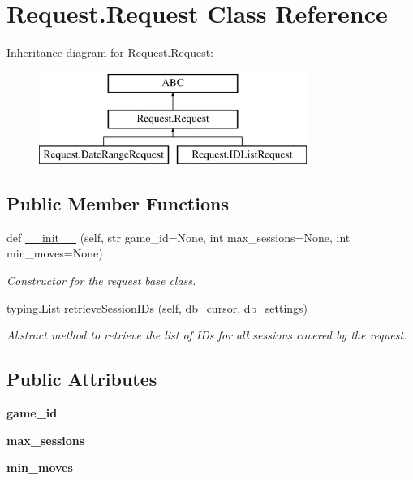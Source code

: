 \hypertarget{class_request_1_1_request}{}\section{Request.\+Request Class Reference}
\label{class_request_1_1_request}
Inheritance diagram for Request.\+Request\+:\begin{figure}[H]
\begin{center}
\leavevmode
\includegraphics[height=3.000000cm]{class_request_1_1_request}
\end{center}
\end{figure}
\subsection*{Public Member Functions}
\begin{DoxyCompactItemize}
\item 
def \mbox{\hyperlink{class_request_1_1_request_a4b2b15d3918230c6b56025e0ef7326ab}{\+\_\+\+\_\+init\+\_\+\+\_\+}} (self, str game\+\_\+id=None, int max\+\_\+sessions=None, int min\+\_\+moves=None)
\begin{DoxyCompactList}\small\item\em Constructor for the request base class. \end{DoxyCompactList}\item 
typing.\+List \mbox{\hyperlink{class_request_1_1_request_aa65df0d73c5d2524053dbedd666c7d9e}{retrieve\+Session\+I\+Ds}} (self, db\+\_\+cursor, db\+\_\+settings)
\begin{DoxyCompactList}\small\item\em Abstract method to retrieve the list of I\+Ds for all sessions covered by the request. \end{DoxyCompactList}\end{DoxyCompactItemize}
\subsection*{Public Attributes}
\begin{DoxyCompactItemize}
\item 
\mbox{\label{class_request_1_1_request_a520789a0d1abb508824a0ef6f5d4ac6e}} 
{\bfseries game\+\_\+id}
\item 
\mbox{\label{class_request_1_1_request_ae3194d12360e8581ee6d31c3fd0dbefe}} 
{\bfseries max\+\_\+sessions}
\item 
\mbox{\label{class_request_1_1_request_a7f4e3723e0b4b3415c3527caf74c6944}} 
{\bfseries min\+\_\+moves}
\end{DoxyCompactItemize}


